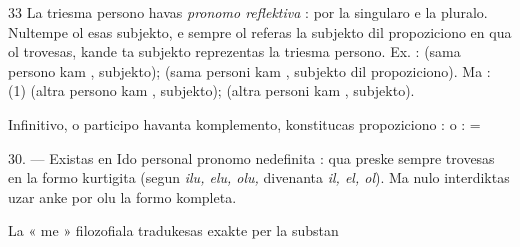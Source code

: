 \begin{VUpage}[37]{33}
La triesma persono havas \textit{pronomo reflektiva} :  por la\nl
singularo e la pluralo. Nultempe ol esas subjekto, e sempre\nl
ol referas la subjekto dil propoziciono en qua ol trovesas,\nl
kande ta subjekto reprezentas la triesma persono. Ex. :\nl
{} (sama persono kam , subjekto); \nl
{} (sama personi kam , subjekto dil propoziciono).\nl
Ma :  (1) (altra persono kam , subjekto);\nl
{} (altra personi kam , subjekto).

Infinitivo, o participo havanta komplemento, konstitucas\nl
propoziciono :  o : \nl
{} = 

\VUblanc{5.85pt}%
30. --- Existas en Ido personal pronomo nedefinita : \nl
qua preske sempre trovesas en la formo kurtigita  (segun\nl
\textit{ilu, elu, olu,} divenanta \textit{il, el, ol}). Ma nulo interdiktas uzar\nl
anke por olu la formo kompleta.

La « me » filozofiala tradukesas exakte per la substan\cc
\end{VUpage}

